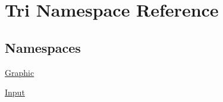 \hypertarget{namespace_tri}{}\section{Tri Namespace Reference}
\label{namespace_tri}
\subsection*{Namespaces}
\begin{DoxyCompactItemize}
\item 
 \hyperlink{namespace_tri_1_1_graphic}{Graphic}
\item 
 \hyperlink{namespace_tri_1_1_input}{Input}
\end{DoxyCompactItemize}

